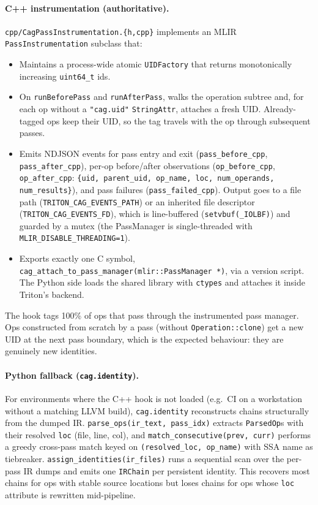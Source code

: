\documentclass[10pt]{article}
\begin{document}
\paragraph{C++ instrumentation (authoritative).} \texttt{cpp/CagPassInstrumentation.\{h,cpp\}} implements an MLIR \texttt{PassInstrumentation} subclass that:
\begin{itemize}[leftmargin=*,itemsep=0.1em,topsep=0.2em]
  \item Maintains a process-wide atomic \texttt{UIDFactory} that returns monotonically increasing \texttt{uint64\_t} ids.
  \item On \texttt{runBeforePass} and \texttt{runAfterPass}, walks the operation subtree and, for each op without a \texttt{"cag.uid"} \texttt{StringAttr}, attaches a fresh UID. Already-tagged ops keep their UID, so the tag travels with the op through subsequent passes.
  \item Emits NDJSON events for pass entry and exit (\texttt{pass\_before\_cpp}, \texttt{pass\_after\_cpp}), per-op before/after observations (\texttt{op\_before\_cpp}, \texttt{op\_after\_cpp}: \texttt{\{uid, parent\_uid, op\_name, loc, num\_operands, num\_results\}}), and pass failures (\texttt{pass\_failed\_cpp}). Output goes to a file path (\texttt{TRITON\_CAG\_EVENTS\_PATH}) or an inherited file descriptor (\texttt{TRITON\_CAG\_EVENTS\_FD}), which is line-buffered (\texttt{setvbuf(\_IOLBF)}) and guarded by a mutex (the PassManager is single-threaded with \texttt{MLIR\_DISABLE\_THREADING=1}).
  \item Exports exactly one C symbol, \texttt{cag\_attach\_to\_pass\_manager(mlir::PassManager *)}, via a version script. The Python side loads the shared library with \texttt{ctypes} and attaches it inside Triton's backend.
\end{itemize}

The hook tags 100\% of ops that pass through the instrumented pass manager. Ops constructed from scratch by a pass (without \texttt{Operation::clone}) get a new UID at the next pass boundary, which is the expected behaviour: they are genuinely new identities.

\paragraph{Python fallback (\texttt{cag.identity}).} For environments where the C++ hook is not loaded (e.g.~CI on a workstation without a matching LLVM build), \texttt{cag.identity} reconstructs chains structurally from the dumped IR. \texttt{parse\_ops(ir\_text, pass\_idx)} extracts \texttt{ParsedOp}s with their resolved \texttt{loc} (file, line, col), and \texttt{match\_consecutive(prev, curr)} performs a greedy cross-pass match keyed on \texttt{(resolved\_loc, op\_name)} with SSA name as tiebreaker. \texttt{assign\_identities(ir\_files)} runs a sequential scan over the per-pass IR dumps and emits one \texttt{IRChain} per persistent identity. This recovers most chains for ops with stable source locations but loses chains for ops whose \texttt{loc} attribute is rewritten mid-pipeline.
\end{document}
